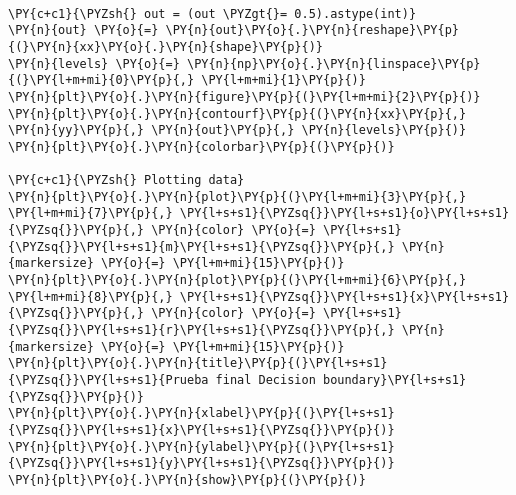     \begin{center}
    \end{center}
    { \hspace*{\fill} \\}
    
    \begin{tcolorbox}[breakable, size=fbox, boxrule=1pt, pad at break*=1mm,colback=cellbackground, colframe=cellborder]
\begin{Verbatim}[commandchars=\\\{\}]
\PY{c+c1}{\PYZsh{} out = (out \PYZgt{}= 0.5).astype(int)}
\PY{n}{out} \PY{o}{=} \PY{n}{out}\PY{o}{.}\PY{n}{reshape}\PY{p}{(}\PY{n}{xx}\PY{o}{.}\PY{n}{shape}\PY{p}{)}
\PY{n}{levels} \PY{o}{=} \PY{n}{np}\PY{o}{.}\PY{n}{linspace}\PY{p}{(}\PY{l+m+mi}{0}\PY{p}{,} \PY{l+m+mi}{1}\PY{p}{)}
\PY{n}{plt}\PY{o}{.}\PY{n}{figure}\PY{p}{(}\PY{l+m+mi}{2}\PY{p}{)}
\PY{n}{plt}\PY{o}{.}\PY{n}{contourf}\PY{p}{(}\PY{n}{xx}\PY{p}{,} \PY{n}{yy}\PY{p}{,} \PY{n}{out}\PY{p}{,} \PY{n}{levels}\PY{p}{)}
\PY{n}{plt}\PY{o}{.}\PY{n}{colorbar}\PY{p}{(}\PY{p}{)}
 
\PY{c+c1}{\PYZsh{} Plotting data}
\PY{n}{plt}\PY{o}{.}\PY{n}{plot}\PY{p}{(}\PY{l+m+mi}{3}\PY{p}{,} \PY{l+m+mi}{7}\PY{p}{,} \PY{l+s+s1}{\PYZsq{}}\PY{l+s+s1}{o}\PY{l+s+s1}{\PYZsq{}}\PY{p}{,} \PY{n}{color} \PY{o}{=} \PY{l+s+s1}{\PYZsq{}}\PY{l+s+s1}{m}\PY{l+s+s1}{\PYZsq{}}\PY{p}{,} \PY{n}{markersize} \PY{o}{=} \PY{l+m+mi}{15}\PY{p}{)}
\PY{n}{plt}\PY{o}{.}\PY{n}{plot}\PY{p}{(}\PY{l+m+mi}{6}\PY{p}{,} \PY{l+m+mi}{8}\PY{p}{,} \PY{l+s+s1}{\PYZsq{}}\PY{l+s+s1}{x}\PY{l+s+s1}{\PYZsq{}}\PY{p}{,} \PY{n}{color} \PY{o}{=} \PY{l+s+s1}{\PYZsq{}}\PY{l+s+s1}{r}\PY{l+s+s1}{\PYZsq{}}\PY{p}{,} \PY{n}{markersize} \PY{o}{=} \PY{l+m+mi}{15}\PY{p}{)}
\PY{n}{plt}\PY{o}{.}\PY{n}{title}\PY{p}{(}\PY{l+s+s1}{\PYZsq{}}\PY{l+s+s1}{Prueba final Decision boundary}\PY{l+s+s1}{\PYZsq{}}\PY{p}{)}
\PY{n}{plt}\PY{o}{.}\PY{n}{xlabel}\PY{p}{(}\PY{l+s+s1}{\PYZsq{}}\PY{l+s+s1}{x}\PY{l+s+s1}{\PYZsq{}}\PY{p}{)}
\PY{n}{plt}\PY{o}{.}\PY{n}{ylabel}\PY{p}{(}\PY{l+s+s1}{\PYZsq{}}\PY{l+s+s1}{y}\PY{l+s+s1}{\PYZsq{}}\PY{p}{)}
\PY{n}{plt}\PY{o}{.}\PY{n}{show}\PY{p}{(}\PY{p}{)}
\end{Verbatim}
\end{tcolorbox}

    \begin{center}
    \end{center}
    { \hspace*{\fill} \\}
    

